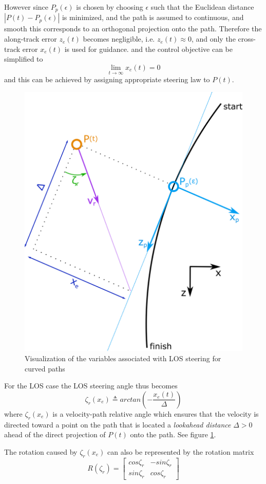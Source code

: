However since \(P_p(\epsilon)\) is chosen by choosing \(\epsilon\) such that the Euclidean distance \(|P(t) - P_p(\epsilon)|\) is minimized, and the path is assumed to continuous, and smooth this corresponds to an orthogonal projection onto the path. Therefore the along-track error \(z_e(t)\) becomes negligible, i.e. \(z_e(t) \approx 0\), and only the cross-track error \(x_e(t)\) is used for guidance. and the control objective can be simplified to 
\begin{equation}
    \lim_{t \to \infty} x_e(t) = 0
\end{equation}
and this can be achieved by assigning appropriate steering law to \(P(t)\). 
\begin{figure} [H]
    \centering
    \includegraphics[width=0.65\linewidth]{images/inkscape/pathframee.png}
    \caption{Visualization of the variables associated with LOS steering for curved paths}
    \label{fig:pathframe}
\end{figure}
For the LOS case the LOS steering angle thus becomes
\begin{equation}
    \zeta_r(x_e) \triangleq arctan(-\frac{x_e(t)}{\Delta})
\end{equation}
where \(\zeta_r(x_e)\) is a velocity-path relative angle which ensures that the velocity is directed toward a point on the path that is located a \textit{lookahead distance} \(\Delta>0\) ahead of the direct projection of \(P(t)\) onto the path. See figure \ref{fig:pathframe}.


The rotation caused by \(\zeta_r(x_e)\) can also be represented by the rotation matrix 
\begin{equation}
    R(\zeta_r) = \begin{bmatrix}
        cos\zeta_r & -sin\zeta_r \\
        sin \zeta_r & cos\zeta_r
    \end{bmatrix}
\end{equation}

